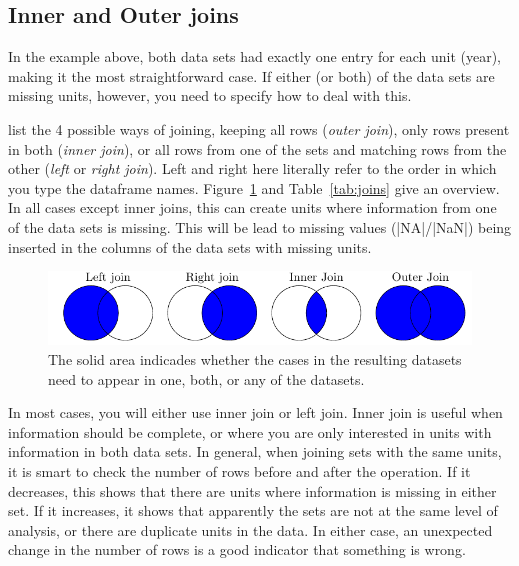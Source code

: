 \subsection{Inner and Outer joins}

In the example above, both data sets had exactly one entry for each unit (year), making it the most straightforward case.
If either (or both) of the data sets are missing units, however, you need to specify how to deal with this.

 list the 4 possible ways of joining, keeping all rows (\emph{outer join}), only rows present in both (\emph{inner join}), or all rows from one of the sets and matching rows from the other (\emph{left} or \emph{right join}). Left and right here literally refer to the order in which you type the dataframe names. Figure~\ref{fig:joinvenn} and Table~\ref{tab:joins} give an overview. 
In all cases except inner joins, this can create units where information from one of the data sets is missing.
This will be lead to missing values (|NA|/|NaN|) being inserted in the columns of the data sets with missing units.

%
\begin{figure}
    \centering
    \includegraphics{figures/ch07_figjoins}
    \caption{The solid area indicades whether the cases in the resulting datasets need to appear in one, both, or any of the datasets.}
    \label{fig:joinvenn}
\end{figure}



In most cases, you will either use inner join or left join.
Inner join is useful when information should be complete,
or where you are only interested in units with information in both data sets.
In general, when joining sets with the same units, it is smart to check the number of rows before and after the operation.
If it decreases, this shows that there are units where information is missing in either set.
If it increases, it shows that apparently the sets are not at the same level of analysis,
or there are duplicate units in the data.
In either case, an unexpected change in the number of rows is a good indicator that something is wrong.

